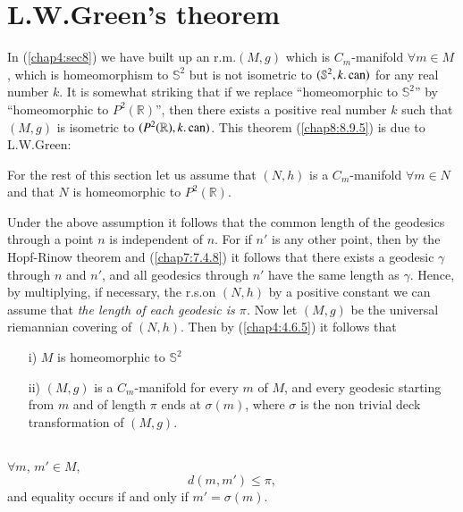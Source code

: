 \section{L.W.\@ Green's theorem}\label{chap8:sec9}

In (\ref{chap4:sec8}) we have built up an r.m.\@ $(M,g)$ which is
$C_{m}$-manifold $\forall m\in M$, which is homeomorphism to
$\mathbb{S}^{2}$ but is not isometric to $(\mathbb{S}^{2},k.\operatorname{can})$ for
any real number $k$. It is somewhat striking that if we replace
``homeomorphic to $\mathbb{S}^{2}$'' by ``homeomorphic to
$P^{2}(\mathbb{R})$'', then there exists a positive real number $k$
such that $(M,g)$ is isometric to $(P^{2}(\mathbb{R}),k.\operatorname{can})$. This
theorem (\ref{chap8:8.9.5}) is due to L.W.\@ Green: \cite{13}

For the rest of this section let us assume that $(N,h)$ is a
$C_{m}$-manifold $\forall m\in N$ and that $N$ is homeomorphic to
$P^{2}(\mathbb{R})$. 

Under the above assumption it follows that the common length of the
geodesics through a point $n$ is independent of $n$. For if $n'$ is
any other point, then by the Hopf-Rinow theorem and (\ref{chap7:7.4.8})
it follows that there exists a geodesic $\gamma$ through $n$ and $n'$,
and all geodesics through $n'$ have the same length as
$\gamma$. Hence, by multiplying, if necessary, the r.s.\@ on $(N,h)$
by a positive constant we can assume that {\em the length of each
  geodesic is $\pi$.} Now let $(M,g)$ be the universal riemannian
covering of $(N,h)$. Then by (\ref{chap4:4.6.5}) it follows that
\begin{itemize}
\item[i)] $M$ \pageoriginale is homeomorphic to $\mathbb{S}^{2}$

\item[ii)] $(M,g)$ is a $C_{m}$-manifold for every $m$ of $M$, and
  every geodesic starting from $m$ and of length $\pi$ ends at
  $\sigma(m)$, where $\sigma$ is the non trivial deck transformation
  of $(M,g)$.
\end{itemize}


\subsection{}\label{chap8:8.9.1}


\begin{lemma*}
$\forall m$, $m'\in M$,
$$
d(m,m')\leq \pi,
$$
and equality occurs if and only if $m'=\sigma(m)$.
\end{lemma*}

